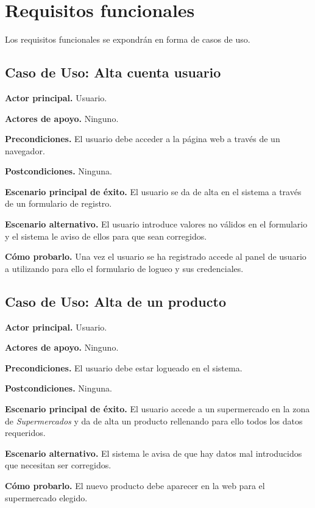 \section{Requisitos funcionales}

Los requisitos funcionales se expondrán en forma de casos de uso.

\subsection{Caso de Uso: Alta cuenta usuario}

    \textbf{Actor principal.} Usuario.

    \textbf{Actores de apoyo.} Ninguno.

    \textbf{Precondiciones.} El usuario debe acceder a la página web a través de un navegador.

    \textbf{Postcondiciones.} Ninguna.

    \textbf{Escenario principal de éxito.} El usuario se da de alta en el sistema a través de un formulario de registro.

    \textbf{Escenario alternativo.} El usuario introduce valores no válidos en el formulario y el sistema le aviso de ellos para que sean corregidos.

    \textbf{Cómo probarlo.} Una vez el usuario se ha registrado accede al panel de usuario a utilizando para ello el formulario de logueo y sus credenciales.

\subsection{Caso de Uso: Alta de un producto}

    \textbf{Actor principal.} Usuario.

    \textbf{Actores de apoyo.} Ninguno.

    \textbf{Precondiciones.} El usuario debe estar logueado en el sistema.

    \textbf{Postcondiciones.} Ninguna.

    \textbf{Escenario principal de éxito.} El usuario accede a un supermercado en la zona de \emph{Supermercados} y da de alta un producto rellenando para ello todos los datos requeridos.

    \textbf{Escenario alternativo.} El sistema le avisa de que hay datos mal introducidos que necesitan ser corregidos.

    \textbf{Cómo probarlo.} El nuevo producto debe aparecer en la web para el supermercado elegido.

